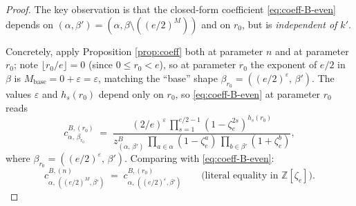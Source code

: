 \documentclass[11pt]{article}
\theoremstyle{definition}
\theoremstyle{remark}
\newcommand{\zetae}{\zeta_e}
\newcommand{\ZZ}{\mathbb{Z}}
\newcommand{\zB}{z^{B}}
\newcommand{\eps}{\varepsilon}
\begin{document}
\begin{proof}
The key observation is that the closed-form coefficient \eqref{eq:coeff-B-even} depends on $(\alpha, \beta') = (\alpha, \beta \setminus ((e/2)^M))$ and on $r_0$, but is \emph{independent of $k'$}.

Concretely, apply Proposition \ref{prop:coeff} both at parameter $n$ and at parameter $r_0$; note $\lfloor r_0/e\rfloor = 0$ (since $0 \le r_0 < e$), so at parameter $r_0$ the exponent of $e/2$ in $\beta$ is $M_{\text{base}} = 0 + \eps = \eps$, matching the ``base'' shape $\beta_{r_0} = ((e/2)^{\eps},\, \beta')$. The values $\eps$ and $h_s(r_0)$ depend only on $r_0$, so \eqref{eq:coeff-B-even} at parameter $r_0$ reads
\begin{equation}\label{eq:c-r0}
  c^{B, (r_0)}_{\alpha,\, \beta_{r_0}}
  \;=\; \frac{(2/e)^{\eps}\, \prod_{s=1}^{e/2 - 1} (1 - \zetae^{2s})^{h_s(r_0)}}{\zB_{(\alpha,\, \beta')}\, \prod_{a \in \alpha}(1 - \zetae^{a})\, \prod_{b \in \beta'}(1 + \zetae^{b})},
\end{equation}
where $\beta_{r_0} = ((e/2)^{\eps},\, \beta')$. Comparing with \eqref{eq:coeff-B-even}:
\begin{equation}\label{eq:c-match}
  c^{B, (n)}_{\alpha,\, ((e/2)^{M}, \beta')} \;=\; c^{B, (r_0)}_{\alpha,\, ((e/2)^{\eps}, \beta')} \qquad \text{(literal equality in $\ZZ[\zetae]$)}.
\end{equation}


\end{proof}
\end{document}
